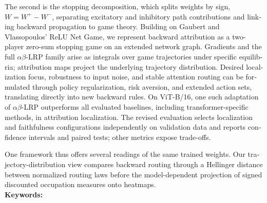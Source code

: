 \begin{otherlanguage}{english}
The second is the stopping decomposition, which splits weights by sign, $W = W^+ - W^-$, separating excitatory and inhibitory path contributions and linking backward propagation to game theory. Building on Gaubert and Vlassopoulos' ReLU Net Game, we represent backward attribution as a two-player zero-sum stopping game on an extended network graph. Gradients and the full $\alpha\beta$-LRP family arise as integrals over game trajectories under specific equilibria; attribution maps project the underlying trajectory distribution. Desired localization focus, robustness to input noise, and stable attention routing can be formulated through policy regularization, risk aversion, and extended action sets, translating directly into new backward rules. On ViT-B/16, one such adaptation of $\alpha\beta$-LRP outperforms all evaluated baselines, including transformer-specific methods, in attribution localization. The revised evaluation selects localization and faithfulness configurations independently on validation data and reports confidence intervals and paired tests; other metrics expose trade-offs.

One framework thus offers several readings of the same trained weights. Our trajectory-distribution view compares backward routing through a Hellinger distance between normalized routing laws before the model-dependent projection of signed discounted occupation measures onto heatmaps.
\\[2ex]
\textbf{Keywords:} \itshape \englishkeywords
\end{otherlanguage}
